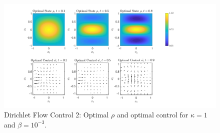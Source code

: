 \documentclass[11pt, a4paper]{article}
\theoremstyle{definition}
\begin{document}
	\begin{figure}[h]
		\centering
		\includegraphics[scale=0.35]{FcEx2k1b.png}
		\caption{Dirichlet Flow Control 2: Optimal $\rho$ and optimal control for $\kappa = 1$ and $\beta = 10^{-3}$.} 
		\label{F5c}
	\end{figure}
	
\end{document}
